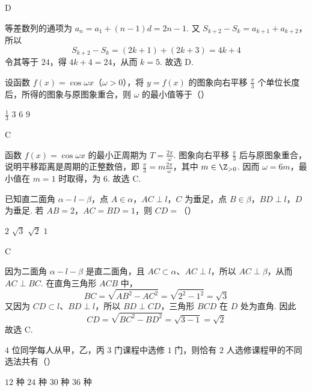 \begin{answer}
D
\end{answer}

\begin{solution}
等差数列的通项为 \(a_n=a_1+(n-1)d=2n-1\). 又 \(S_{k+2}-S_k=a_{k+1}+a_{k+2}\)，所以
\[
S_{k+2}-S_k=(2k+1)+(2k+3)=4k+4
\]
令其等于 \(24\)，得 \(4k+4=24\)，从而 \(k=5\). 故选 D.
\end{solution}

\begin{problem}
设函数 \(f(x)=\cos\omega x\)（\(\omega>0\)），将 \(y=f(x)\) 的图象向右平移 \(\frac{\pi}{3}\) 个单位长度后，所得的图象与原图象重合，则 \(\omega\) 的最小值等于（\quad）

\choices
    {\(\frac{1}{3}\)}
    {\(3\)}
    {\(6\)}
    {\(9\)}
\end{problem}

\begin{answer}
C
\end{answer}

\begin{solution}
函数 \(f(x)=\cos\omega x\) 的最小正周期为 \(T=\frac{2\pi}{\omega}\). 图象向右平移 \(\frac{\pi}{3}\) 后与原图象重合，说明平移距离是周期的正整数倍，即 \(\frac{\pi}{3}=m\frac{2\pi}{\omega}\)，其中 \(m\in\Z_{>0}\). 因而 \(\omega=6m\)，最小值在 \(m=1\) 时取得，为 \(6\). 故选 C.
\end{solution}

\begin{problem}
已知直二面角 \(\alpha-l-\beta\)，点 \(A\in\alpha\)，\(AC\perp l\)，\(C\) 为垂足，点 \(B\in\beta\)，\(BD\perp l\)，\(D\) 为垂足. 若 \(AB=2\)，\(AC=BD=1\)，则 \(CD=\)（\quad）

\choices
    {\(2\)}
    {\(\sqrt{3}\)}
    {\(\sqrt{2}\)}
    {\(1\)}
\end{problem}

\begin{answer}
C
\end{answer}

\begin{solution}
因为二面角 \(\alpha-l-\beta\) 是直二面角，且 \(AC\subset\alpha\)、\(AC\perp l\)，所以 \(AC\perp\beta\)，从而 \(AC\perp BC\). 在直角三角形 \(ACB\) 中，
\[
BC=\sqrt{AB^2-AC^2}=\sqrt{2^2-1^2}=\sqrt{3}
\]
又因为 \(CD\subset l\)、\(BD\perp l\)，所以 \(BD\perp CD\)，三角形 \(BCD\) 在 \(D\) 处为直角. 因此
\[
CD=\sqrt{BC^2-BD^2}=\sqrt{3-1}=\sqrt{2}
\]
故选 C.
\end{solution}

\begin{problem}
\(4\) 位同学每人从甲，乙，丙 \(3\) 门课程中选修 \(1\) 门，则恰有 \(2\) 人选修课程甲的不同选法共有（\quad）

\choices
    {\(12\) 种}
    {\(24\) 种}
    {\(30\) 种}
    {\(36\) 种}
\end{problem}

